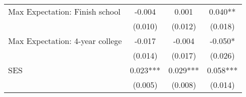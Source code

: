 {\begin{tabular}{lccc}
\hspace{3mm}Max Expectation: Finish school&      -0.004   &       0.001   &       0.040** \\
                    &     (0.010)   &     (0.012)   &     (0.018)   \\
 
\hspace{3mm}Max Expectation: 4-year college&      -0.017   &      -0.004   &      -0.050*  \\
                    &     (0.014)   &     (0.017)   &     (0.026)   \\
 
\hspace{3mm}SES     &       0.023***&       0.029***&       0.058***\\
                    &     (0.005)   &     (0.008)   &     (0.014)   \\
 

\bottomrule
\end{tabular}
}
